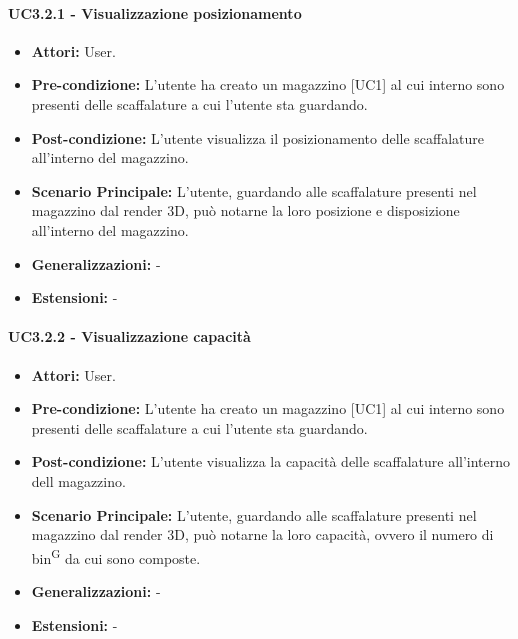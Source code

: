 \paragraph{UC3.2.1 - Visualizzazione posizionamento}
\begin{itemize}
    \item \textbf{Attori:} User.
    \item \textbf{Pre-condizione:} L'utente ha creato un magazzino [UC1] al cui interno sono presenti delle scaffalature a cui l'utente sta guardando.
    \item \textbf{Post-condizione:} L'utente visualizza il posizionamento delle scaffalature all'interno del magazzino.
    \item \textbf{Scenario Principale:} L'utente, guardando alle scaffalature presenti nel magazzino dal render 3D, può notarne la loro posizione e disposizione all'interno del magazzino.
    \item \textbf{Generalizzazioni:} -
    \item \textbf{Estensioni:} -
\end{itemize}


\paragraph{UC3.2.2 - Visualizzazione capacità}
\begin{itemize}
    \item \textbf{Attori:} User.
    \item \textbf{Pre-condizione:} L'utente ha creato un magazzino [UC1] al cui interno sono presenti delle scaffalature a cui l'utente sta guardando.
    \item \textbf{Post-condizione:} L'utente visualizza la capacità delle scaffalature all'interno dell magazzino.
    \item \textbf{Scenario Principale:}  L'utente, guardando alle scaffalature presenti nel magazzino dal render 3D, può notarne la loro capacità, ovvero il numero di bin\textsuperscript{G} da cui sono composte.
    \item \textbf{Generalizzazioni:} -
    \item \textbf{Estensioni:} -
\end{itemize}


